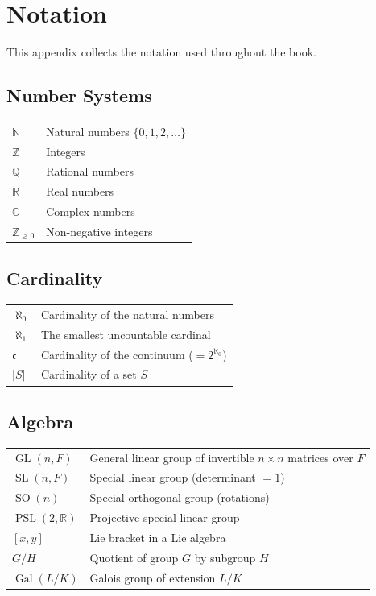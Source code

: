 
\chapter*{Notation}

This appendix collects the notation used throughout the book.

\section*{Number Systems}

\begin{tabular}{ll}
$\mathbb{N}$ & Natural numbers $\{0, 1, 2, \ldots\}$ \\
$\mathbb{Z}$ & Integers \\
$\mathbb{Q}$ & Rational numbers \\
$\mathbb{R}$ & Real numbers \\
$\mathbb{C}$ & Complex numbers \\
$\mathbb{Z}_{\geq 0}$ & Non-negative integers \\
\end{tabular}

\section*{Cardinality}

\begin{tabular}{ll}
$\aleph_0$ & Cardinality of the natural numbers \\
$\aleph_1$ & The smallest uncountable cardinal \\
$\mathfrak{c}$ & Cardinality of the continuum ($= 2^{\aleph_0}$) \\
$|S|$ & Cardinality of a set $S$ \\
\end{tabular}

\section*{Algebra}

\begin{tabular}{ll}
$\operatorname{GL}(n, F)$ & General linear group of invertible $n \times n$ matrices over $F$ \\
$\operatorname{SL}(n, F)$ & Special linear group (determinant $= 1$) \\
$\operatorname{SO}(n)$ & Special orthogonal group (rotations) \\
$\operatorname{PSL}(2, \mathbb{R})$ & Projective special linear group \\
$[x, y]$ & Lie bracket in a Lie algebra \\
$G/H$ & Quotient of group $G$ by subgroup $H$ \\
$\operatorname{Gal}(L/K)$ & Galois group of extension $L/K$ \\
\end{tabular}

